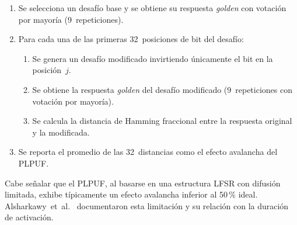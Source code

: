 \begin{enumerate}
  \item Se selecciona un desafío base y se obtiene su respuesta \textit{golden}
    con votación por mayoría (9~repeticiones).
  \item Para cada una de las primeras 32~posiciones de bit del desafío:
    \begin{enumerate}
      \item Se genera un desafío modificado invirtiendo únicamente el bit en
        la posición~$j$.
      \item Se obtiene la respuesta \textit{golden} del desafío modificado
        (9~repeticiones con votación por mayoría).
      \item Se calcula la distancia de Hamming fraccional entre la respuesta
        original y la modificada.
    \end{enumerate}
  \item Se reporta el promedio de las 32~distancias como el efecto avalancha
    del PLPUF.
\end{enumerate}

Cabe señalar que el PLPUF, al basarse en una estructura LFSR con difusión
limitada, exhibe típicamente un efecto avalancha inferior al 50\,\% ideal.
Alsharkawy~et~al.~\cite{alsharkawy_2024_plpufs} documentaron esta limitación
y su relación con la duración de activación.

